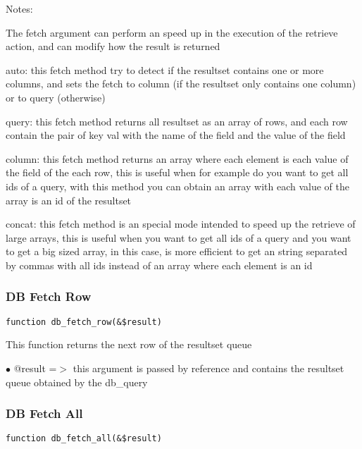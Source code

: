 \documentclass[a4paper]{article}
\begin{document}
Notes:

The fetch argument can perform an speed up in the execution of the retrieve action, and
can modify how the result is returned

auto: this fetch method try to detect if the resultset contains one or more columns, and
sets the fetch to column (if the resultset only contains one column) or to query (otherwise)

query: this fetch method returns all resultset as an array of rows, and each row contain the
pair of key val with the name of the field and the value of the field

column: this fetch method returns an array where each element is each value of the field of
the each row, this is useful when for example do you want to get all ids of a query, with
this method you can obtain an array with each value of the array is an id of the resultset

concat: this fetch method is an special mode intended to speed up the retrieve of large
arrays, this is useful when you want to get all ids of a query and you want to get a big
sized array, in this case, is more efficient to get an string separated by commas with all
ids instead of an array where each element is an id

\hypertarget{toc89}{}
\subsubsection{DB Fetch Row}

\begin{lstlisting}
function db_fetch_row(&$result)
\end{lstlisting}

This function returns the next row of the resultset queue

\begin{compactitem}
\item[\color{myblue}$\bullet$] @result =$>$ this argument is passed by reference and contains the resultset queue
           obtained by the db\_query
\end{compactitem}

\hypertarget{toc90}{}
\subsubsection{DB Fetch All}

\begin{lstlisting}
function db_fetch_all(&$result)
\end{lstlisting}
\end{document}
